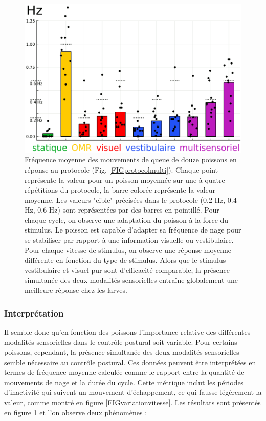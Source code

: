 \begin{figure}
    \centering
    \includegraphics[width=\textwidth]{./files/stats3.svg.png}
    \caption{
    Fréquence moyenne des mouvements de queue de douze poissons en réponse au protocole (Fig. \ref{FIGprotocolmulti}). Chaque point représente la valeur pour un poisson moyennée sur une à quatre répétitions du protocole, la barre colorée représente la valeur moyenne. Les valeurs "cible" précisées dans le protocole (0.2 Hz, 0.4 Hz, 0.6 Hz) sont représentées par des barres en pointillé. Pour chaque cycle, on observe une adaptation du poisson à la force du stimulus. Le poisson est capable d'adapter sa fréquence de nage pour se stabiliser par rapport à une information visuelle ou vestibulaire. Pour chaque vitesse de stimulus, on observe une réponse moyenne différente en fonction du type de stimulus. Alors que le stimulus vestibulaire et visuel pur sont d'efficacité comparable, la présence simultanée des deux modalités sensorielles entraîne globalement une meilleure réponse chez les larves.
    \label{FIGstatsmultimodal}}
    \end{figure}

\subsubsection{Interprétation}

Il semble donc qu'en fonction des poissons l'importance relative des différentes modalités sensorielles dans le contrôle postural soit variable. Pour certains poissons, cependant, la présence simultanée des deux modalités sensorielles semble nécessaire au contrôle postural. Ces données peuvent être interprétées en termes de fréquence moyenne calculée comme le rapport entre la quantité de mouvements de nage et la durée du cycle. Cette métrique inclut les périodes d'inactivité qui suivent un mouvement d'échappement, ce qui fausse légèrement la valeur, comme montré en figure \ref{FIGvariationvitesse}. Les résultats sont présentés en figure \ref{FIGstatsmultimodal} et l'on observe deux phénomènes :

